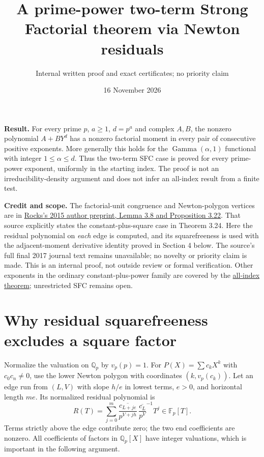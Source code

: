 \documentclass[11pt]{article}
\title{A prime-power two-term Strong Factorial theorem via Newton residuals}
\author{Internal written proof and exact certificates; no priority claim}
\date{16 November 2026}
\newcommand{\Q}{\mathbb Q}
\newcommand{\F}{\mathbb F}
\newcommand{\vp}{v_p}
\begin{document}
\maketitle
\noindent\textbf{Result.}
For every prime $p$, $a\ge1$, $d=p^a$ and complex $A,B$, the nonzero
polynomial $A+BY^d$ has a nonzero factorial moment in every pair of
consecutive positive exponents. More generally this holds for the
$\operatorname{Gamma}(\alpha,1)$ functional with integer $1\le\alpha\le d$.
Thus the two-term SFC case is proved for every prime-power exponent,
uniformly in the starting index. The proof is not an irreducibility-density
argument and does not infer an all-index result from a finite test.

\textbf{Credit and scope.}
The factorial-unit congruence and Newton-polygon vertices are in
\href{sources/rocks-2015-author-preprint.pdf}{Rocks's 2015 author preprint,
Lemma 3.8 and Proposition 3.22}. That source explicitly states the
constant-plus-square case in Theorem 3.24. Here the residual polynomial
on \emph{each} edge is computed, and its squarefreeness is used with the
adjacent-moment derivative identity proved in Section 4 below.
The source's full final 2017 journal text remains unavailable; no novelty
or priority claim is made. This is an internal proof, not outside review
or formal verification. Other exponents in the ordinary constant-plus-power family are covered by the
\href{ALL_UNIVARIATE_TWO_TERM_SFC.tex}{all-index theorem}; unrestricted SFC remains open.

\section{Why residual squarefreeness excludes a square factor}
Normalize the valuation on $\Q_p$ by $\vp(p)=1$.
For $P(X)=\sum c_kX^k$ with $c_0c_n\ne0$, use the lower Newton polygon
with coordinates $(k,\vp(c_k))$. Let an edge run from $(L,V)$ with slope
$h/e$ in lowest terms, $e>0$, and horizontal length $me$.
Its normalized residual polynomial is
\[
 R(T)=\sum_{j=0}^{m}
 \overline{\frac{c_{L+je}}{p^{V+jh}}}\,
 \overline{\frac{c_L}{p^V}}^{-1}T^j\in\F_p[T].       \tag{1}
\]
Terms strictly above the edge contribute zero; the two end coefficients
are nonzero. All coefficients of factors in $\Q_p[X]$ have integer
valuations, which is important in the following argument.
\end{document}
